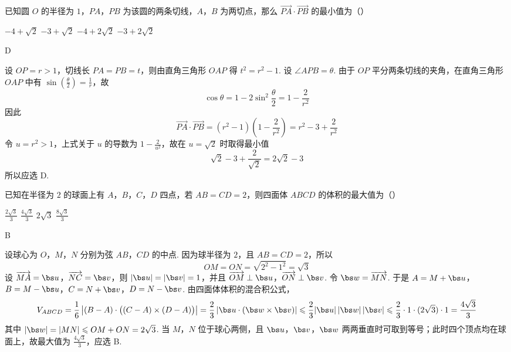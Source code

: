 \begin{problem}
已知圆 \(O\) 的半径为 \(1\)，\(PA\)，\(PB\) 为该圆的两条切线，\(A\)，\(B\) 为两切点，那么 \(\overrightarrow{PA} \cdot \overrightarrow{PB}\) 的最小值为（\quad）

\choices
    {\(-4 + \sqrt{2}\)}
    {\(-3 + \sqrt{2}\)}
    {\(-4 + 2\sqrt{2}\)}
    {\(-3 + 2\sqrt{2}\)}
\end{problem}

\begin{answer}
D
\end{answer}

\begin{solution}
设 \(OP=r>1\)，切线长 \(PA=PB=t\)，则由直角三角形 \(OAP\) 得
\(t^{2}=r^{2}-1\). 设 \(\angle APB=\theta\). 由于 \(OP\) 平分两条切线的夹角，在直角三角形 \(OAP\) 中有
\(\sin(\frac{\theta}{2})=\frac{1}{r}\)，故
\[
\cos\theta=1-2\sin^{2}\frac{\theta}{2}=1-\frac{2}{r^{2}}
\]
因此
\[
\overrightarrow{PA}\cdot\overrightarrow{PB}
=(r^{2}-1)\left(1-\frac{2}{r^{2}}\right)
=r^{2}-3+\frac{2}{r^{2}}
\]
令 \(u=r^{2}>1\)，上式关于 \(u\) 的导数为 \(1-\frac{2}{u^{2}}\)，故在
\(u=\sqrt2\) 时取得最小值
\[
\sqrt2-3+\frac{2}{\sqrt2}=2\sqrt2-3
\]
所以应选 D.
\end{solution}

\begin{problem}
已知在半径为 \(2\) 的球面上有 \(A\)，\(B\)，\(C\)，\(D\) 四点，若 \(AB = CD = 2\)，则四面体 \(ABCD\) 的体积的最大值为（\quad）

\choices
    {\(\frac{2\sqrt{3}}{3}\)}
    {\(\frac{4\sqrt{3}}{3}\)}
    {\(2\sqrt{3}\)}
    {\(\frac{8\sqrt{3}}{3}\)}
\end{problem}

\begin{answer}
B
\end{answer}

\begin{solution}
设球心为 \(O\)，\(M\)，\(N\) 分别为弦 \(AB\)，\(CD\) 的中点. 因为球半径为 \(2\)，且
\(AB=CD=2\)，所以
\[
OM=ON=\sqrt{2^{2}-1^{2}}=\sqrt3
\]
设 \(\overrightarrow{MA}=\bs u\)，\(\overrightarrow{NC}=\bs v\)，则
\(|\bs u|=|\bs v|=1\)，并且 \(\overrightarrow{OM}\perp\bs u\)，\(\overrightarrow{ON}\perp\bs v\). 令
\(\bs w=\overrightarrow{MN}\). 于是
\(A=M+\bs u\)，\(B=M-\bs u\)，\(C=N+\bs v\)，\(D=N-\bs v\). 由四面体体积的混合积公式，
\[
V_{ABCD}=\frac16\left|(B-A)\cdot\bigl((C-A)\times(D-A)\bigr)\right|
=\frac23\left|\bs u\cdot(\bs w\times\bs v)\right|
\leqslant\frac{2}{3}|\bs u|\,|\bs w|\,|\bs v|
\leqslant\frac{2}{3}\cdot1\cdot(2\sqrt3)\cdot1
=\frac{4\sqrt3}{3}
\]
其中 \(|\bs w|=|MN|\leqslant OM+ON=2\sqrt3\). 当 \(M\)，\(N\) 位于球心两侧，且 \(\bs u\)，\(\bs v\)，\(\bs w\) 两两垂直时可取到等号；此时四个顶点均在球面上，故最大值为
\(\frac{4\sqrt3}{3}\)，应选 B.
\end{solution}

